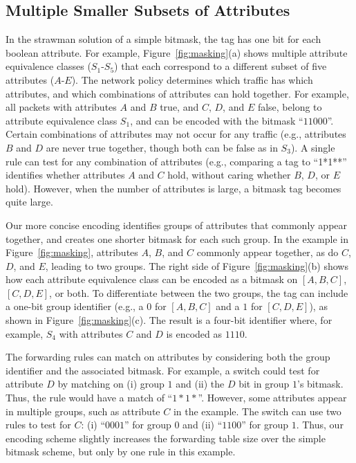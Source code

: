 \subsection{Multiple Smaller Subsets of Attributes}
\label{ssec:mset}
In the strawman solution of a simple bitmask, the tag has one bit for
each boolean attribute.  For example, Figure~\ref{fig:masking}(a)
shows multiple attribute equivalence classes ($S_1$-$S_5$) that each
correspond to a different subset of five attributes ($A$-$E$).  The
network policy determines which traffic has which attributes, and
which combinations of attributes can hold together.  For example, all
packets with attributes $A$ and $B$ true, and $C$, $D$, and $E$ false,
belong to attribute equivalence class $S_1$, and can be encoded with
the bitmask ``$11000$''.  Certain combinations of attributes may not
occur for any traffic (e.g., attributes $B$ and $D$ are never true
together, though both can be false as in $S_3$).  A single rule can
test for any combination of attributes (e.g., comparing a tag to
``1*1**'' identifies whether attributes $A$ and $C$ hold, without
caring whether $B$, $D$, or $E$ hold).  However, when the number of
attributes is large, a bitmask tag becomes quite large.

Our more concise encoding identifies groups of attributes that
commonly appear together, and creates one shorter bitmask for each
such group.  In the example in Figure~\ref{fig:masking}, attributes
$A$, $B$, and $C$ commonly appear together, as do $C$, $D$, and $E$,
leading to two groups.  The right side of Figure~\ref{fig:masking}(b)
shows how each attribute equivalence class can be encoded as a bitmask
on $[A,B,C]$, $[C,D,E]$, or both.  To differentiate between the two
groups, the tag can include a one-bit group identifier (e.g., a $0$
for $[A,B,C]$ and a $1$ for $[C,D,E]$), as shown in
Figure~\ref{fig:masking}(c).  The result is a four-bit identifier
where, for example, $S_4$ with attributes $C$ and $D$ is encoded as
$1110$.

The forwarding rules can match on attributes by considering both the
group identifier and the associated bitmask.  For example, a switch
could test for attribute $D$ by matching on (i) group $1$ and (ii) the
$D$ bit in group $1$'s bitmask.  Thus, the rule would have a match of
``$1*1*$''.  However, some attributes appear in multiple groups, such
as attribute $C$ in the example.  The switch can use two rules to test
for $C$: (i) ``$0001$'' for group $0$ and (ii) ``$1100$'' for group
$1$.  Thus, our encoding scheme slightly increases the forwarding
table size over the simple bitmask scheme, but only by one rule in
this example.

